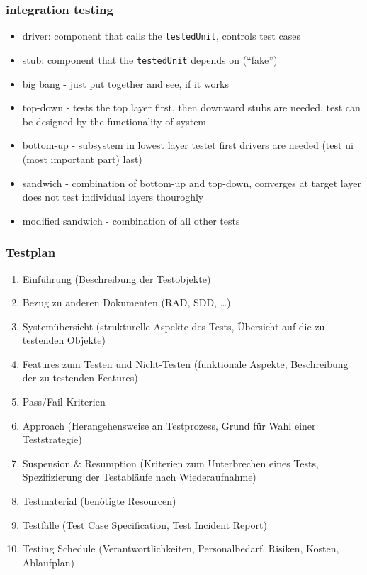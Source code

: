 \documentclass[a4paper, 10pt]{article}
\begin{document}
\subsubsection{integration testing}
\begin{itemize}
	\item driver: component that calls the \texttt{testedUnit}, controls test cases
	\item stub: component that the \texttt{testedUnit} depends on (``fake'')
	\item big bang - just put together and see, if it works
	\item top-down - tests the top layer first, then downward \follows stubs are needed, test can be designed by the functionality of system
	\item bottom-up - subsystem in lowest layer testet first \follows drivers are needed (test ui (most important part) last)
	\item sandwich - combination of bottom-up and top-down, converges at target layer \follows does not test individual layers thouroghly
	\item modified sandwich - combination of all other tests
\end{itemize}

\subsubsection{Testplan}
\begin{enumerate}
	\item Einführung (Beschreibung der Testobjekte)
	\item Bezug zu anderen Dokumenten (RAD, SDD, \dots)
	\item Systemübersicht (strukturelle Aspekte des Tests, Übersicht auf die zu testenden Objekte)
	\item Features zum Testen und Nicht-Testen (funktionale Aspekte, Beschreibung der zu testenden Features)
	\item Pass/Fail-Kriterien
	\item Approach (Herangehensweise an Testprozess, Grund für Wahl einer Teststrategie)
	\item Suspension \& Resumption (Kriterien zum Unterbrechen eines Tests, Spezifizierung der Testabläufe nach Wiederaufnahme)
	\item Testmaterial (benötigte Resourcen)
	\item Testfälle (Test Case Specification, Test Incident Report)
	\item Testing Schedule (Verantwortlichkeiten, Personalbedarf, Risiken, Kosten, Ablaufplan)
\end{enumerate}
\end{document}
